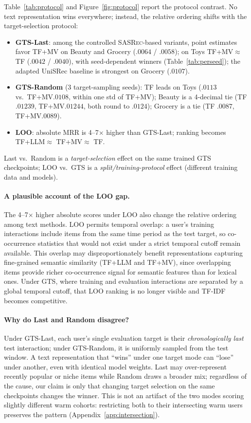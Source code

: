 \documentclass[sigconf,natbib=true,anonymous]{acmart}
\newcommand{\tfidf}{\textsc{TF-IDF}\xspace}
\newcommand{\tfllm}{\textsc{TF+LLM}\xspace}
\newcommand{\tfmv}{\textsc{TF+MV}\xspace}
\newcommand{\base}{\textsc{SASRec}\xspace}
\begin{document}
Table~\ref{tab:protocol} and Figure~\ref{fig:protocol} report the protocol contrast.
No text representation wins everywhere; instead, the relative ordering shifts with the target-selection protocol:

\begin{itemize}[leftmargin=*,itemsep=1pt]
\item \textbf{GTS-Last}: among the controlled \base-based variants, point estimates favor \tfmv on Beauty and Grocery ($.0064$ / $.0058$); on Toys TF+MV${}\approx{}$TF ($.0042$ / $.0040$), with seed-dependent winners (Table~\ref{tab:perseed}); the adapted UniSRec baseline is strongest on Grocery ($.0107$).
\item \textbf{GTS-Random} (3 target-sampling seeds): TF leads on Toys ($.0113$ vs.\ \tfmv $.0108$, within one std of \tfmv); Beauty is a 4-decimal tie (TF $.01239$, \tfmv $.01244$, both round to $.0124$); Grocery is a tie (TF $.0087$, \tfmv $.0089$).
\item \textbf{LOO}: absolute MRR is 4--7$\times$ higher than GTS-Last; ranking becomes \tfllm $\approx$ \tfmv $\approx$ TF.
\end{itemize}
Last vs.\ Random is a \emph{target-selection} effect on the same trained GTS checkpoints; LOO vs.\ GTS is a \emph{split/training-protocol} effect (different training data and models).

\paragraph{A plausible account of the LOO gap.}
The 4--7$\times$ higher absolute scores under LOO also change the relative ordering among text methods.
LOO permits temporal overlap: a user's training interactions include items from the same time period as the test target, so co-occurrence statistics that would not exist under a strict temporal cutoff remain available.
This overlap may disproportionately benefit representations capturing fine-grained semantic similarity (\tfllm and \tfmv), since overlapping items provide richer co-occurrence signal for semantic features than for lexical ones.
Under GTS, where training and evaluation interactions are separated by a global temporal cutoff, that LOO ranking is no longer visible and \tfidf becomes competitive.

\paragraph{Why do Last and Random disagree?}
Under GTS-Last, each user's single evaluation target is their \emph{chronologically last} test interaction; under GTS-Random, it is uniformly sampled from the test window.
A text representation that ``wins'' under one target mode can ``lose'' under another, even with identical model weights.
Last may over-represent recently popular or niche items while Random draws a broader mix; regardless of the cause, our claim is only that changing target selection on the same checkpoints changes the winner.
This is not an artifact of the two modes scoring slightly different warm cohorts: restricting both to their intersecting warm users preserves the pattern (Appendix~\ref{app:intersection}).
\end{document}
